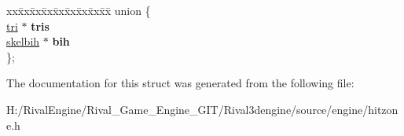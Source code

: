 \begin{DoxyCompactItemize}
\begin{tabbing}
\end{tabbing}\item 
\mbox{\label{structskelhitzone_ab82540908d7304a95c72b8b95004f319}} 
\begin{tabbing}
xx\=xx\=xx\=xx\=xx\=xx\=xx\=xx\=xx\=\kill
union \{\\
\>\hyperlink{structskelbih_1_1tri}{tri} $\ast$ {\bfseries tris}\\
\>\hyperlink{structskelbih}{skelbih} $\ast$ {\bfseries bih}\\
\}; \\

\end{tabbing}\end{DoxyCompactItemize}


The documentation for this struct was generated from the following file\+:\begin{DoxyCompactItemize}
\item 
H\+:/\+Rival\+Engine/\+Rival\+\_\+\+Game\+\_\+\+Engine\+\_\+\+G\+I\+T/\+Rival3dengine/source/engine/hitzone.\+h\end{DoxyCompactItemize}
